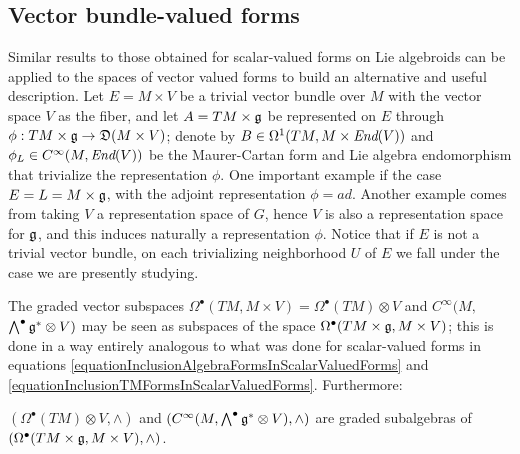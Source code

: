 



\subsection{Vector bundle-valued forms}


Similar results to those obtained for scalar-valued forms on Lie algebroids can be applied to the spaces of vector valued forms to build an alternative and useful description. Let $E = M \times V$ be a trivial vector bundle over $M$ with the vector space $V$ as the fiber, and let $A = TM \times \mathfrak{g}$ be represented on $E$ through $\phi: TM \times \alg g \to \alg D(M \times V)$; denote by $B \in \Omega^1(TM, M \times \operatorname{\textit{End}}(V))$ and $\phi_L \in C^\infty(M, \End(V))$ be the Maurer-Cartan form and Lie algebra endomorphism that trivialize the representation $\phi$. One important example if the case $E = L = M \times \mathfrak{g}$, with the adjoint representation $\phi = ad$. Another example comes from taking $V$ a representation space of $G$, hence $V$ is also a representation space for $\mathfrak{g}$, and this induces naturally a representation $\phi$. Notice that if $E$ is not a trivial vector bundle, on each trivializing neighborhood $U$ of $E$ we fall under the case we are presently studying.

The graded vector subspaces $\Omega^\bullet(TM, M \times V) = \Omega^\bullet(TM)\otimes V$ and $C^\infty(M,$ $ \bigwedge^\bullet \mathfrak{g}^* \otimes V)$ may be seen as subspaces of the space $\Omega^\bullet(TM \times \mathfrak{g}, M \times V)$; this is done in a way entirely analogous to what was done for scalar-valued forms in equations \eqref{equationInclusionAlgebraFormsInScalarValuedForms} and \eqref{equationInclusionTMFormsInScalarValuedForms}. Furthermore:
\begin{proposition}
    $(\Omega^\bullet(TM) \otimes V, \wedge)$ and $(C^\infty(M, \bigwedge^\bullet \mathfrak{g}^* \otimes V), \wedge)$ are graded subalgebras of $(\Omega^\bullet(TM\times \mathfrak{g}, M \times V), \wedge)$.
    
\end{proposition}

